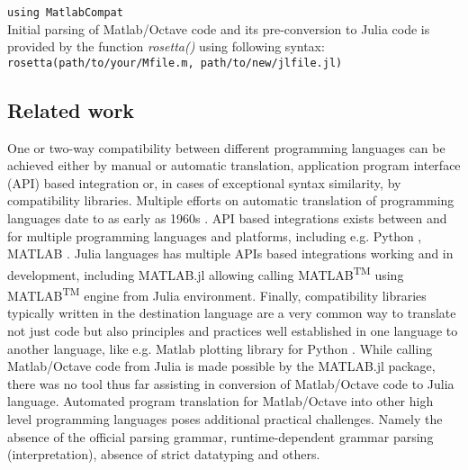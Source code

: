 \verb|using MatlabCompat|\\

Initial parsing of Matlab/Octave code and its pre-conversion to Julia code is provided by the function \textit{rosetta()} using following syntax:\\

\verb|rosetta(path/to/your/Mfile.m, path/to/new/jlfile.jl)|\\

\subsection{Related work}

One or two-way compatibility between different programming languages can be achieved either by manual or automatic translation, application program interface (API) based integration or, in cases of exceptional syntax similarity, by compatibility libraries. Multiple efforts on automatic translation of programming languages date to as early as 1960s \cite{Ledley_1962, irons1961syntax}. API based integrations exists between and for multiple programming languages and platforms, including e.g. Python \cite{autin2012upy}, MATLAB \cite{Bornstein_2008}. Julia languages has multiple APIs based integrations working and in development, including MATLAB.jl allowing calling MATLAB\textsuperscript{TM} using MATLAB\textsuperscript{TM} engine from Julia environment. Finally, compatibility libraries typically written in the destination language are a very common way to translate not just code but also principles and practices well established in one language to another language, like e.g. Matlab plotting library for Python \cite{Hunter_2007, barrett2005matplotlib}. While calling Matlab/Octave code from Julia is made possible by the MATLAB.jl package, there was no tool thus far assisting in conversion of Matlab/Octave 
code to Julia language. Automated program translation for Matlab/Octave into other high level programming languages poses additional practical challenges. Namely the absence of the official parsing grammar, runtime-dependent grammar parsing (interpretation), absence of strict datatyping and others.

